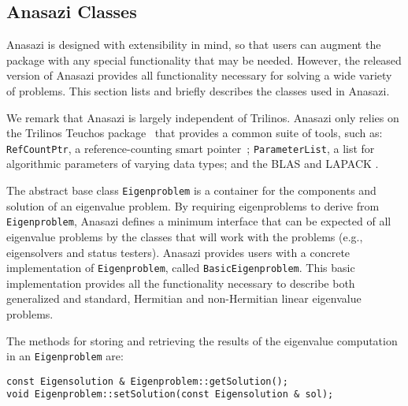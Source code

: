\documentclass[acmtoms]{acmtrans2m}
\newcounter{algorithm}
\newcommand{\aspace}[1]{\texttt{#1}}
\begin{document}
\subsection{Anasazi Classes}
\label{subsec:anasazi:classes}

Anasazi is designed with extensibility in mind, so that users can
augment the package with any special functionality that may be
needed. However, the released version of Anasazi provides all
functionality necessary for solving a wide variety of problems. This
section lists and briefly describes the classes used in Anasazi.


We remark that Anasazi is largely independent of Trilinos. Anasazi
only relies on the Trilinos Teuchos package~\cite{Trilinos:Teuchos}
that provides a common suite of tools, such as: \texttt{RefCountPtr},
a reference-counting smart pointer~\cite{detlefs92garbage};
\texttt{ParameterList}, a list for algorithmic parameters of
varying data types; and the BLAS
\cite{Lawson:1979:BLA,Blackford:2002:USB} and LAPACK \cite{abbd:95}.

The abstract base class \aspace{Eigenproblem} is a container for the components and
solution of an eigenvalue problem. By requiring eigenproblems to derive from
\aspace{Eigenproblem}, Anasazi defines a minimum interface that can be expected of all
eigenvalue problems by the classes that will work with the problems (e.g., eigensolvers
and status testers). Anasazi provides users with a concrete implementation of
\aspace{Eigenproblem}, called \aspace{BasicEigenproblem}. This basic implementation
provides all the functionality necessary to describe both generalized and standard,
Hermitian and non-Hermitian linear eigenvalue problems.

The methods for storing and retrieving the results of the
eigenvalue computation in an \aspace{Eigenproblem} are:
\begin{verbatim}
const Eigensolution & Eigenproblem::getSolution();
void Eigenproblem::setSolution(const Eigensolution & sol);
\end{verbatim}
\end{document}
